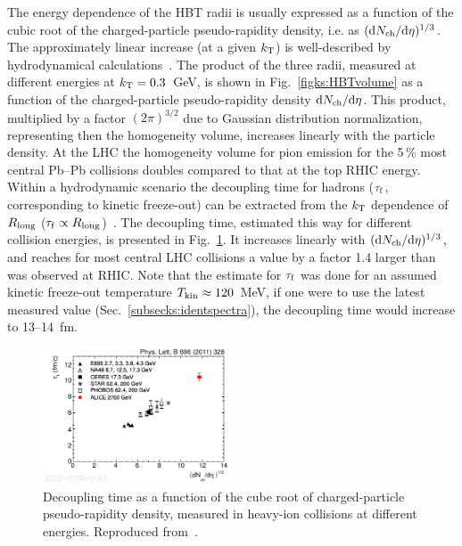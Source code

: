 The energy dependence of the HBT radii is usually expressed as a function of the cubic root of the charged-particle pseudo-rapidity density, i.e. as $({\rm d}N_{\rm ch}/{\rm d}\eta)^{1/3}$. The approximately linear increase (at a given $k_{\rm T}$) is well-described by hydrodynamical calculations~\cite{Chojnacki:2007rq,Karpenko:2009wf}. The product of the three radii, measured at different energies at $k_{\rm T} = 0.3$~GeV, is shown in Fig.~\ref{figks:HBTvolume} as a function of the charged-particle pseudo-rapidity density ${\rm d}N_{\rm ch}/{\rm d}\eta$. This product, multiplied by a factor $(2\pi)^{3/2}$ due to Gaussian distribution normalization, representing then the homogeneity volume, increases linearly with the particle density. At the LHC the homogeneity volume for pion emission for the 5\,\% most central Pb--Pb collisions doubles compared to that at the top RHIC energy. Within a hydrodynamic scenario the decoupling time for hadrons ($\tau_{\rm f}$, corresponding to kinetic freeze-out) can be extracted from the $k_{\rm T}$ dependence of $R_{\rm long}$ ($\tau_{\rm f} \propto R_{\rm long}$)~\cite{Herrmann:1994rr}. The decoupling time, estimated this way for different collision energies, is presented in Fig.~\ref{figks:HBTtime}. It increases linearly with $({\rm d}N_{\rm ch}/{\rm d}\eta)^{1/3}$, and reaches for most central LHC collisions a value by a factor 1.4 larger than was observed at RHIC. Note that the estimate for $\tau_{\rm f}$ was done for an assumed kinetic freeze-out temperature $T_{\rm kin} \approx 120$~MeV, if one were to use the latest measured value (Sec.~\ref{subsecks:identspectra}), the decoupling time would increase to 13--14~fm.

\begin{figure}
\centering
\includegraphics[width=0.5\textwidth]{ksfigures/HBTDecouplTime.pdf}
\caption{Decoupling time as a function of the cube root of charged-particle pseudo-rapidity density, measured in heavy-ion collisions at different energies. Reproduced from~\cite{Aamodt:2011mr}.}
\label{figks:HBTtime}
\end{figure}

